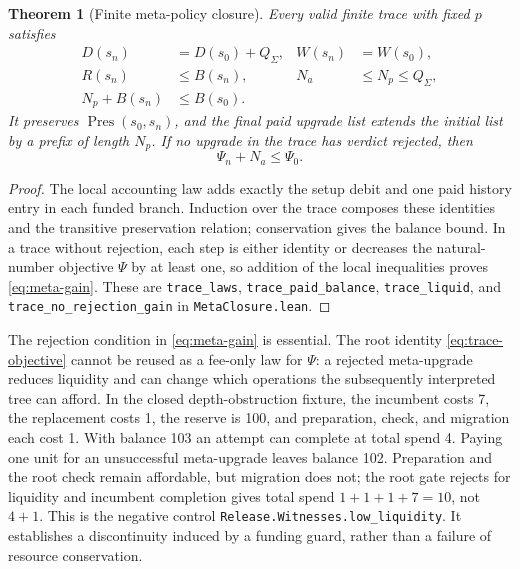 \documentclass[10pt,letterpaper]{article}
\newtheorem{theorem}{Theorem}[section]
\newcommand{\Pres}{\operatorname{Pres}}
\newcommand{\rc}[1]{\texttt{#1}}
\begin{document}
\begin{theorem}[Finite meta-policy closure]\label{thm:meta-closure}
Every valid finite trace with fixed $p$ satisfies
\begin{align}
 D(s_n)&=D(s_0)+Q_\Sigma,& W(s_n)&=W(s_0),\\
 R(s_n)&\le B(s_n),& N_a&\le N_p\le Q_\Sigma,\\
 N_p+B(s_n)&\le B(s_0).
\end{align}
It preserves $\Pres(s_0,s_n)$, and the final paid upgrade list extends the initial list by a prefix of length $N_p$. If no upgrade in the trace has verdict \emph{rejected}, then
\begin{equation}\label{eq:meta-gain}
 \Psi_n+N_a\le\Psi_0.
\end{equation}
\end{theorem}
\begin{proof}
The local accounting law adds exactly the setup debit and one paid history entry in each funded branch. Induction over the trace composes these identities and the transitive preservation relation; conservation gives the balance bound. In a trace without rejection, each step is either identity or decreases the natural-number objective $\Psi$ by at least one, so addition of the local inequalities proves \eqref{eq:meta-gain}. These are \rc{trace\_laws}, \rc{trace\_paid\_balance}, \rc{trace\_liquid}, and \rc{trace\_no\_rejection\_gain} in \rc{MetaClosure.lean}.
\end{proof}

The rejection condition in \eqref{eq:meta-gain} is essential. The root identity \eqref{eq:trace-objective} cannot be reused as a fee-only law for $\Psi$: a rejected meta-upgrade reduces liquidity and can change which operations the subsequently interpreted tree can afford. In the closed depth-obstruction fixture, the incumbent costs 7, the replacement costs 1, the reserve is 100, and preparation, check, and migration each cost 1. With balance 103 an attempt can complete at total spend 4. Paying one unit for an unsuccessful meta-upgrade leaves balance 102. Preparation and the root check remain affordable, but migration does not; the root gate rejects for liquidity and incumbent completion gives total spend $1+1+1+7=10$, not $4+1$. This is the negative control \rc{Release.Witnesses.low\_liquidity}. It establishes a discontinuity induced by a funding guard, rather than a failure of resource conservation.
\end{document}
